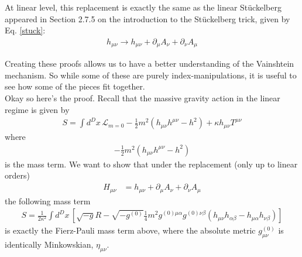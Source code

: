 \documentclass{book}
\theoremstyle{definition}
\newcommand{\p}{\partial}
\newcommand{\lag}{\mathcal{L}}
\newcommand{\f}[2]{\frac{#1}{#2}}
\newcommand{\lp}{\left(}
\newcommand{\rp}{\right)}
\newcommand{\lb}{\left[}
\newcommand{\rb}{\right]}
\begin{document}
At linear level, this replacement is exactly the same as the linear St\"{u}ckelberg appeared in Section 2.7.5 on the introduction to the St\"{u}ckelberg trick, given by Eq. \eqref{stuck}:
\begin{align}
\boxed{h_{\mu\nu} \to h_{\mu\nu} + \p_\mu A_\nu + \p_\nu A_\mu}
\end{align}



\begin{framed}
	Creating these proofs allows us to have a better understanding of the Vainshtein mechanism. So while some of these are purely index-manipulations, it is useful to see how some of the pieces fit together.\\
	
	Okay so here's the proof. Recall that the massive gravity action in the linear regime is given by
	\begin{align}
	{S = \int d^Dx\, \lag_{m=0} - \f{1}{2}m^2\lp h_{\mu\nu}h^{\mu\nu} - h^2 \rp + \kappa h_{\mu\nu}T^{\mu\nu}}
	\end{align}
	where
	\begin{align}
	- \f{1}{2}m^2\lp h_{\mu\nu}h^{\mu\nu} - h^2 \rp
	\end{align}
	is the mass term. We want to show that under the replacement (only up to linear orders)
	\begin{align}
	H_{\mu\nu} &= h_{\mu\nu} + \p_\mu A_\nu + \p_\nu A_\mu
	\end{align}
	the following mass term
	\begin{align}
	\boxed{S = \f{1}{2\kappa^2}\int d^Dx\, \lb \sqrt{-g}R - \sqrt{-g^{(0)}}\f{1}{4}m^2 g^{(0)\mu\alpha}g^{(0)\nu\beta}\lp h_{\mu\nu}h_{\alpha\beta} - h_{\mu\alpha}h_{\nu\beta} \rp \rb}
	\end{align}
	is exactly the Fierz-Pauli mass term above, where the absolute metric $g^{(0)}_{\mu\nu}$ is identically Minkowskian, $\eta_{\mu\nu}$.\\
	

\end{framed}
\end{document}
